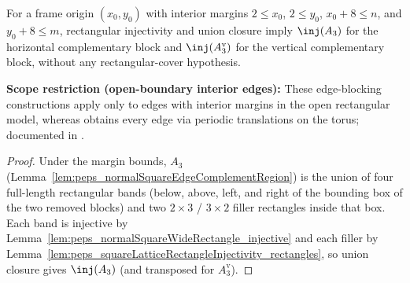 \begin{lemma}%
    \label{lem:peps_normalSquareInteriorEdgeComplement_injective}
    \leanok
    For a frame origin $(x_0,y_0)$ with interior margins $2\le x_0$,
    $2\le y_0$, $x_0+8\le n$, and $y_0+8\le m$, rectangular injectivity and
    union closure imply $\inj(A_3)$ for the horizontal complementary block and
    $\inj(A_3^{\mathrm v})$ for the vertical complementary block, without any
    rectangular-cover hypothesis.

    \textbf{Scope restriction (open-boundary interior edges):}
    These edge-blocking constructions apply only to edges with interior margins
    in the open rectangular model, whereas \cite[Theorem~3]{Molnar2018NormalPEPS}
    obtains every edge via periodic translations on the torus; documented in
    \cite{gap:peps_normal_ft_section3_route}.
\end{lemma}
\begin{proof}\leanok
    Under the margin bounds, $A_3$ (Lemma~\ref{lem:peps_normalSquareEdgeComplementRegion})
    is the union of four full-length rectangular bands (below, above, left, and
    right of the bounding box of the two removed blocks) and two $2\times 3$ /
    $3\times 2$ filler rectangles inside that box. Each band is injective by
    Lemma~\ref{lem:peps_normalSquareWideRectangle_injective} and each filler by
    Lemma~\ref{lem:peps_squareLatticeRectangleInjectivity_rectangles}, so union
    closure gives $\inj(A_3)$ (and transposed for $A_3^{\mathrm v}$).
\end{proof}

